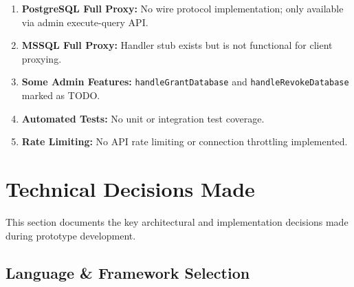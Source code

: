 \begin{enumerate}
    \item \textbf{PostgreSQL Full Proxy:} No wire protocol implementation; only available via admin execute-query API.
    
    \item \textbf{MSSQL Full Proxy:} Handler stub exists but is not functional for client proxying.
    
    \item \textbf{Some Admin Features:} \texttt{handleGrantDatabase} and \texttt{handleRevokeDatabase} marked as TODO.
    
    \item \textbf{Automated Tests:} No unit or integration test coverage.
    
    \item \textbf{Rate Limiting:} No API rate limiting or connection throttling implemented.
\end{enumerate}


\section{Technical Decisions Made}

This section documents the key architectural and implementation decisions made during prototype development.

\subsection{Language \& Framework Selection}

\begin{table}[h]
\centering
{}
\caption{Technology Stack Decisions}
\label{tab:tech-stack}
\end{table}

